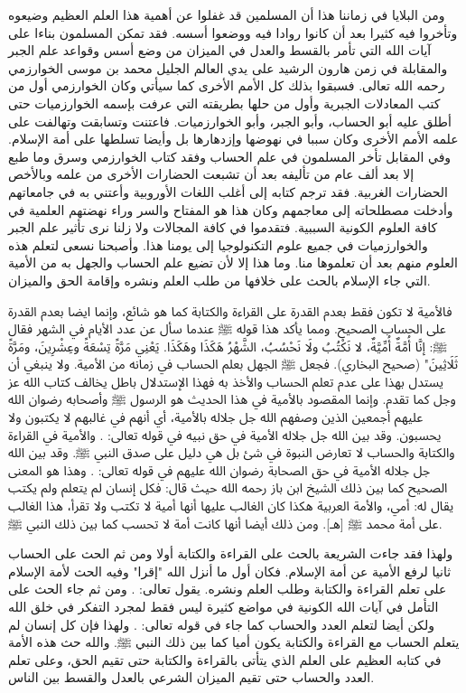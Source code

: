 ومن البلايا في زماننا هذا أن المسلمين قد غفلوا عن أهمية هذا العلم العظيم وضيعوه وتأخروا فيه كثيرا بعد أن كانوا روادا فيه ووضعوا أسسه. فقد تمكن المسلمون  بناءا على آيات الله التي تأمر بالقسط والعدل في الميزان من وضع أسس وقواعد علم الجبر والمقابلة في زمن هارون الرشيد على يدي العالم الجليل محمد بن موسى الخوارزمي رحمه الله تعالى. فسبقوا بذلك كل الأمم الأخرى كما سيأتي وكان الخوارزمي أول من كتب المعادلات الجبرية وأول من حلها بطريقته التي عرفت بإسمه الخوارزميات حتى أطلق عليه أبو الحساب، وأبو الجبر، وأبو الخوارزميات. فاعتنت وتسابقت وتهالفت على علمه الأمم الأخرى وكان سببا في نهوضها وإزدهارها بل وأيضا تسلطها على أمة الإسلام. وفي المقابل تأخر المسلمون في علم الحساب وفقد كتاب الخوارزمي وسرق وما طبع إلا بعد ألف عام من تأليفه بعد أن تشبعت الحضارات الأخرى من علمه وبالأخص الحضارات الغربية. فقد ترجم كتابه إلى أغلب اللغات الأوروبية وأعتني به في جامعاتهم وأدخلت مصطلحاته إلى معاجمهم وكان هذا هو المفتاح والسر وراء نهضتهم العلمية في كافة العلوم الكونية السببية. فتقدموا في كافة المجالات ولا زلنا نرى تأثير علم الجبر والخوارزميات في جميع علوم التكنولوجيا إلى يومنا هذا. وأصبحنا نسعى لتعلم هذه العلوم منهم بعد أن تعلموها منا. وما هذا إلا لأن تضيع علم الحساب والجهل به من الأمية التي جاء الإسلام بالحث على خلافها من طلب العلم ونشره وإقامة الحق والميزان. 

فالأمية لا تكون فقط بعدم القدرة على القراءة والكتابة كما هو شائع، وإنما ايضا بعدم القدرة على الحساب الصحيح. ومما يأكد هذا قوله ﷺ عندما سأل عن عدد الأيام في الشهر فقال ﷺ: إنَّا أُمَّةٌ أُمِّيَّةٌ، لا نَكْتُبُ ولَا نَحْسُبُ، الشَّهْرُ هَكَذَا وهَكَذَا. يَعْنِي مَرَّةً تِسْعَةً وعِشْرِينَ، ومَرَّةً ثَلَاثِينَ" {\footnotesize (صحيح البخاري)}. فجعل ﷺ الجهل بعلم الحساب في زمانه من الأمية. ولا ينبغي أن يستدل بهذا على عدم تعلم الحساب والأخذ به فهذا الإستدلال باطل يخالف كتاب الله عز وجل كما تقدم. وإنما المقصود بالأمية في هذا الحديث هو الرسول ﷺ وأصحابه رضوان الله عليهم أجمعين الذين وصفهم الله جل جلاله بالأمية، أي أنهم في غالبهم لا يكتبون ولا يحسبون. وقد بين الله جل جلاله الأمية في حق نبيه في قوله تعالى: \quranayah*[7][158][21]{\footnotesize \surahname*[7]}. والأمية في القراءة والكتابة والحساب لا تعارض النبوة في شئ بل هي دليل على صدق النبي ﷺ. وقد بين الله جل جلاله الأمية في حق الصحابة رضوان الله عليهم في قوله تعالى: \quranayah*[62][2]{\footnotesize \surahname*[62]}. وهذا هو المعنى الصحيح كما بين ذلك الشيخ ابن باز رحمه الله حيث قال: فكل إنسان لم يتعلم ولم يكتب يقال له: أمي، والأمة العربية هكذا كان الغالب عليها أنها أمية لا تكتب ولا تقرأ، هذا الغالب على أمة محمد ﷺ [هـ]. ومن ذلك أيضا أنها كانت أمة لا تحسب كما بين ذلك النبي ﷺ.

ولهذا فقد جاءت الشريعة بالحث على القراءة والكتابة أولا ومن ثم الحث على الحساب ثانيا لرفع الأمية عن أمة الإسلام. فكان أول ما أنزل الله "إقرا" وفيه الحث لأمة الإسلام على تعلم القراءة والكتابة وطلب العلم ونشره.
يقول تعالى:
\quranayah*[96][1-5]{\footnotesize \surahname*[96]}.
ومن ثم جاء الحث على التأمل في آيات الله الكونية في مواضع كثيرة ليس فقط لمجرد التفكر في خلق الله ولكن أيضا لتعلم العدد والحساب كما جاء في قوله تعالى:
\quranayah*[10][5]{\footnotesize \surahname*[10]}. ولهذا فإن كل إنسان لم يتعلم الحساب مع القراءة والكتابة يكون أميا كما بين ذلك النبي ﷺ. والله حث هذه الأمة في كتابه العظيم على العلم الذي يتأتى بالقراءة والكتابة حتى تقيم الحق، وعلى تعلم العدد والحساب حتى تقيم الميزان الشرعي بالعدل والقسط بين الناس. 

